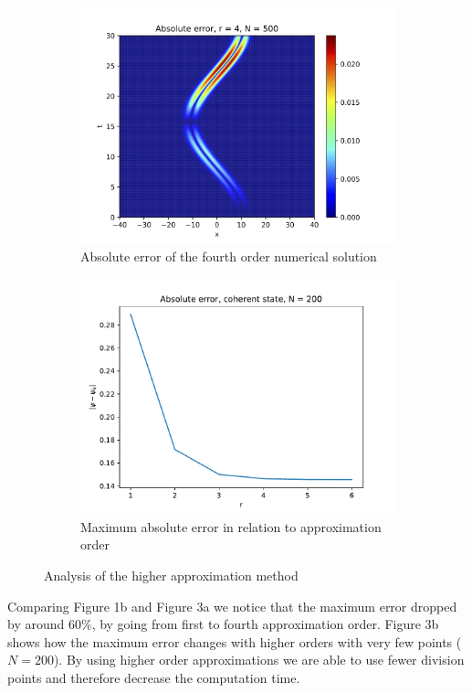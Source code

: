 \documentclass[12pt, a4paper]{article}
\begin{document}
\begin{figure}[hbtp]
  \begin{subfigure}{0.5\textwidth}
  \includegraphics[width=\linewidth]{higher_r4 copy.png}
  \caption{Absolute error of the fourth order numerical solution} \label{fig:a}
  \end{subfigure}
  \hspace*{\fill}
  \begin{subfigure}{0.5\textwidth}
  \includegraphics[width=\linewidth]{error_higher.pdf}
  \caption{Maximum absolute error in relation to approximation order} \label{fig:b}
  \end{subfigure}
  \caption{Analysis of the higher approximation method} \label{fig:1}
\end{figure}

Comparing Figure 1b and Figure 3a we notice that the maximum error dropped by around $60 \%$, by going from first to fourth approximation order. Figure 3b shows how the maximum error changes with higher orders with very few points ($N = 200$). By using higher order approximations we are able to use fewer division points and therefore decrease the computation time.
\end{document}
